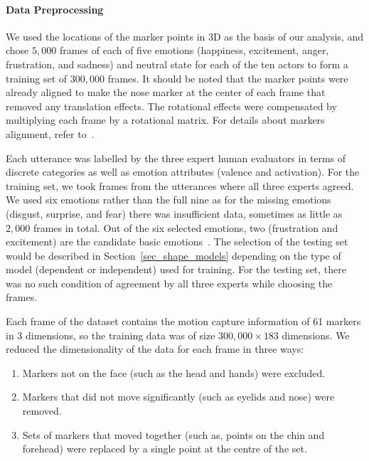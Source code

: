 \documentclass[10pt,journal,cspaper,compsoc]{IEEEtran}
\begin{document}
\paragraph{Data Preprocessing}
\label{sec_data_preprocessing}

We used the locations of the marker points in 3D as the basis of our analysis, and chose $5,000$ frames of each of five emotions (happiness, excitement, anger, frustration, and sadness) and neutral state for each of the ten actors to form a training set of $300,000$ frames. It should be noted that the marker points were already aligned to make the nose marker at the center of each frame that removed any translation effects. The rotational effects were compensated by multiplying each frame by a rotational matrix. For details about markers alignment, refer to~\cite{Busso08}. 

Each utterance was labelled by the three expert human evaluators in terms of discrete categories as well as emotion attributes (valence and activation). For the training set, we took frames from the utterances where all three experts agreed. We used six emotions rather than the full nine as for the missing emotions (disgust, surprise, and fear) there was insufficient data, sometimes as little as $2,000$ frames in total. Out of the six selected emotions, two (frustration and excitement) are the candidate basic emotions~\cite{ortony1990s, ekman1999basic}. The selection of the testing set would be described in Section~\ref{sec_shape_models} depending on the type of model (dependent or independent) used for training. For the testing set, there was no such condition of agreement by all three experts while choosing the frames.

Each frame of the dataset contains the motion capture information of 61 markers in 3 dimensions, so the training data was of size $300,000 \times 183$ dimensions. We reduced the dimensionality of the data for each frame in three ways:

\begin{enumerate}
\item Markers not on the face (such as the head and hands) were excluded.
\item Markers that did not move significantly (such as eyelids and nose) were removed. 
\item Sets of markers that moved together (such as, points on the chin and forehead) were replaced by a single point at the centre of the set.
\end{enumerate}
\end{document}
